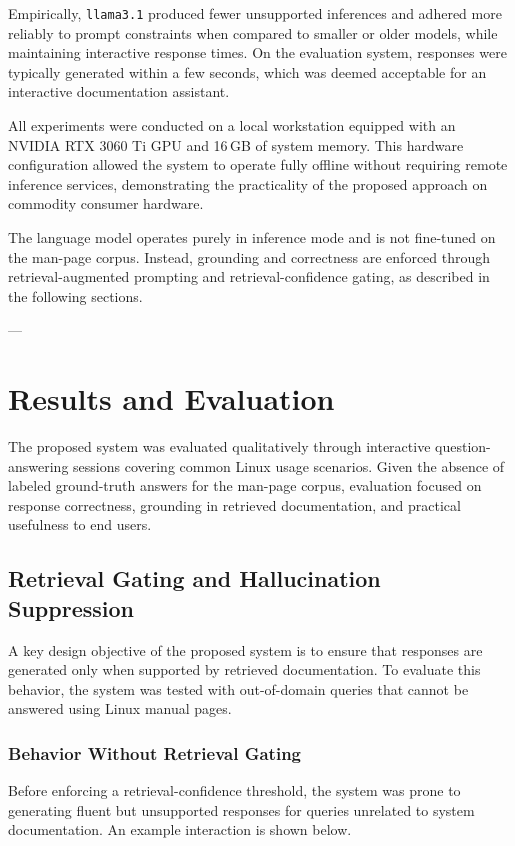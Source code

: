 \documentclass[conference]{IEEEtran}
\begin{document}
Empirically, \texttt{llama3.1} produced fewer unsupported inferences and adhered more reliably to prompt constraints when compared to smaller or older models, while maintaining interactive response times. On the evaluation system, responses were typically generated within a few seconds, which was deemed acceptable for an interactive documentation assistant.

All experiments were conducted on a local workstation equipped with an NVIDIA RTX 3060 Ti GPU and 16\,GB of system memory. This hardware configuration allowed the system to operate fully offline without requiring remote inference services, demonstrating the practicality of the proposed approach on commodity consumer hardware.

The language model operates purely in inference mode and is not fine-tuned on the man-page corpus. Instead, grounding and correctness are enforced through retrieval-augmented prompting and retrieval-confidence gating, as described in the following sections.

---

\section{Results and Evaluation}

The proposed system was evaluated qualitatively through interactive question-answering sessions covering common Linux usage scenarios. Given the absence of labeled ground-truth answers for the man-page corpus, evaluation focused on response correctness, grounding in retrieved documentation, and practical usefulness to end users.

\subsection{Retrieval Gating and Hallucination Suppression}

A key design objective of the proposed system is to ensure that responses are generated only when supported by retrieved documentation. To evaluate this behavior, the system was tested with out-of-domain queries that cannot be answered using Linux manual pages.

\subsubsection{Behavior Without Retrieval Gating}

Before enforcing a retrieval-confidence threshold, the system was prone to generating fluent but unsupported responses for queries unrelated to system documentation. An example interaction is shown below.
\end{document}
